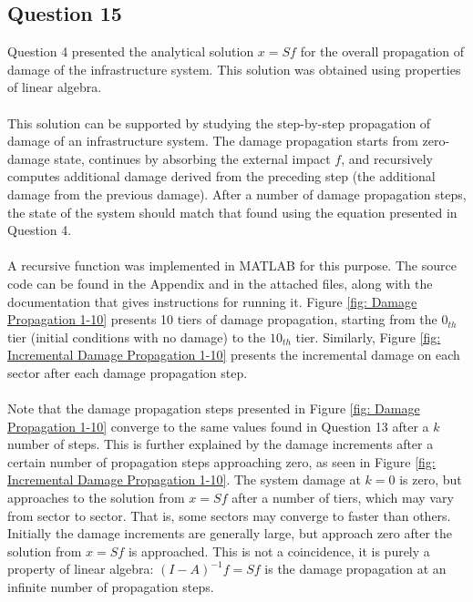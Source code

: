 \documentclass[11pt,a4paper]{article}
\begin{document}
\subsection*{Question 15}
Question 4 presented the analytical solution $x=Sf$ for the overall propagation of damage of the infrastructure system. This solution was obtained using properties of linear algebra. \\
\\
This solution can be supported by studying the step-by-step propagation of damage of an infrastructure system. The damage propagation starts from zero-damage state, continues by absorbing the external impact $f$, and recursively computes additional damage derived from the preceding step (the additional damage from the previous damage). After a number of damage propagation steps, the state of the system should match that found using the equation presented in Question 4. \\
\\
A recursive function was implemented in MATLAB for this purpose. The source code can be found in the Appendix and in the attached files, along with the documentation that gives instructions for running it. Figure \ref{fig: Damage Propagation 1-10} presents 10 tiers of damage propagation, starting from the $0_{th}$ tier (initial conditions with no damage) to the $10_{th}$ tier. Similarly, Figure \ref{fig: Incremental Damage Propagation 1-10} presents the incremental damage on each sector after each damage propagation step. \\
\\
Note that the damage propagation steps presented in Figure \ref{fig: Damage Propagation 1-10} converge to the same values found in Question 13 after a $k$ number of steps. This is further explained by the damage increments after a certain number of propagation steps approaching zero, as seen in Figure \ref{fig: Incremental Damage Propagation 1-10}. The system damage at $k=0$ is zero, but approaches to the solution from $x=Sf$ after a number of tiers, which may vary from sector to sector. That is, some sectors may converge to faster than others. Initially the damage increments are generally large, but approach zero after the solution from $x=Sf$ is approached. This is not a coincidence, it is purely a property of linear algebra: $(I-A)^{-1}f=Sf$ is the damage propagation at an infinite number of propagation steps. 
\end{document}
